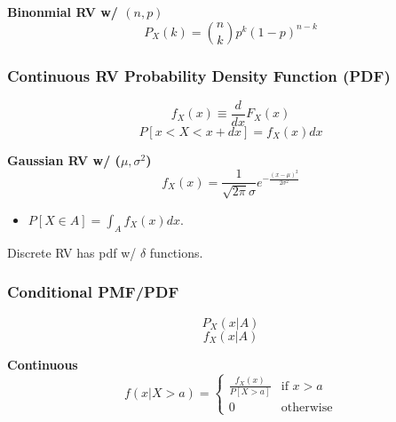 \begin{example} \textbf{Binonmial RV w/ $(n,p)$}
    \begin{equation}
        P_X(k) = \binom{n}{k} p^k (1-p)^{n-k}
    \end{equation}
\end{example}

\subsubsection{Continuous RV Probability Density Function (PDF)}
\begin{definition}
    \begin{equation}
        f_X(x) \equiv \frac{d}{dx} F_X(x)
    \end{equation}
    \begin{equation}
        P[x < X < x+dx] = f_X (x) dx
    \end{equation}
\end{definition}

\begin{example} \textbf{Gaussian RV w/ ($\mu,\sigma^2$)}
    \begin{equation}
        f_X (x) = \frac{1}{\sqrt{2\pi}\sigma} e^{-\frac{(x-\mu)^2}{2\sigma^2}}
    \end{equation}
    \begin{itemize}
        \item $P[X \in A] = \int_{A} f_X(x) dx$.
    \end{itemize}
\end{example}

\begin{notes}
    Discrete RV has pdf w/ $\delta$ functions.
\end{notes}

\subsubsection{Conditional PMF/PDF}
\begin{definition}
    \begin{equation}
        P_X (x|A) 
    \end{equation}
    \begin{equation}
        f_X (x|A)
    \end{equation}
\end{definition}

\begin{example} \textbf{Continuous}
    \begin{equation}
        f(x|X>a) = \begin{cases}
            \frac{f_X(x)}{P[X>a]} & \text{if } x > a \\
            0 & \text{otherwise}
        \end{cases}
    \end{equation}
\end{example}

